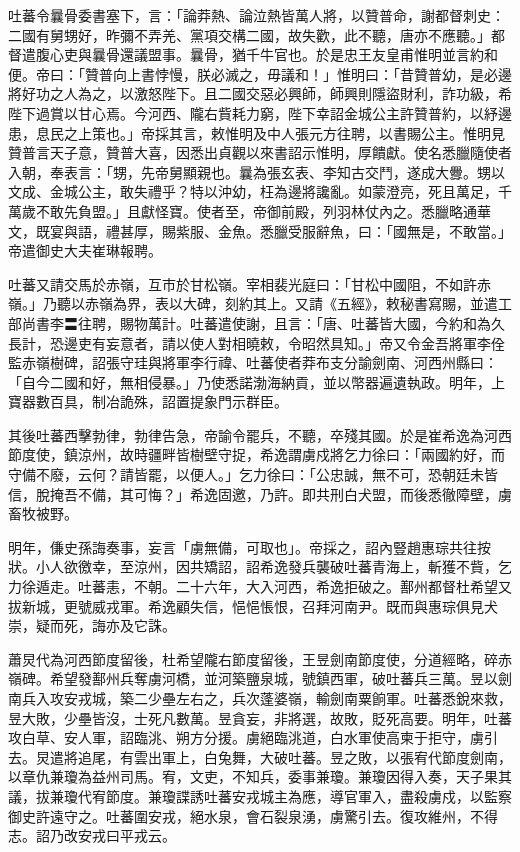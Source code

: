 \begin{pinyinscope}
 吐蕃令曩骨委書塞下，言：「論莽熱、論泣熱皆萬人將，以贊普命，謝都督刺史：二國有舅甥好，昨彌不弄羌、黨項交構二國，故失歡，此不聽，唐亦不應聽。」都督遣腹心吏與曩骨還議盟事。曩骨，猶千牛官也。於是忠王友皇甫惟明並言約和便。帝曰：「贊普向上書悖慢，朕必滅之，毋議和！」惟明曰：「昔贊普幼，是必邊將好功之人為之，以激怒陛下。且二國交惡必興師，師興則隱盜財利，詐功級，希陛下過賞以甘心焉。今河西、隴右貲耗力窮，陛下幸詔金城公主許贊普約，以紓邊患，息民之上策也。」帝採其言，敕惟明及中人張元方往聘，以書賜公主。惟明見贊普言天子意，贊普大喜，因悉出貞觀以來書詔示惟明，厚饋獻。使名悉臘隨使者入朝，奉表言：「甥，先帝舅顯親也。曩為張玄表、李知古交鬥，遂成大釁。甥以文成、金城公主，敢失禮乎？特以沖幼，枉為邊將讒亂。如蒙澄亮，死且萬足，千萬歲不敢先負盟。」且獻怪寶。使者至，帝御前殿，列羽林仗內之。悉臘略通華文，既宴與語，禮甚厚，賜紫服、金魚。悉臘受服辭魚，曰：「國無是，不敢當。」帝遣御史大夫崔琳報聘。



 吐蕃又請交馬於赤嶺，互市於甘松嶺。宰相裴光庭曰：「甘松中國阻，不如許赤嶺。」乃聽以赤嶺為界，表以大碑，刻約其上。又請《五經》，敕秘書寫賜，並遣工部尚書李〓往聘，賜物萬計。吐蕃遣使謝，且言：「唐、吐蕃皆大國，今約和為久長計，恐邊吏有妄意者，請以使人對相曉敕，令昭然具知。」帝又令金吾將軍李佺監赤嶺樹碑，詔張守珪與將軍李行禕、吐蕃使者莽布支分諭劍南、河西州縣曰：「自今二國和好，無相侵暴。」乃使悉諾渤海納貢，並以幣器遍遺執政。明年，上寶器數百具，制冶詭殊，詔置提象門示群臣。



 其後吐蕃西擊勃律，勃律告急，帝諭令罷兵，不聽，卒殘其國。於是崔希逸為河西節度使，鎮涼州，故時疆畔皆樹壁守捉，希逸謂虜戍將乞力徐曰：「兩國約好，而守備不廢，云何？請皆罷，以便人。」乞力徐曰：「公忠誠，無不可，恐朝廷未皆信，脫掩吾不備，其可悔？」希逸固邀，乃許。即共刑白犬盟，而後悉徹障壁，虜畜牧被野。



 明年，傔史孫誨奏事，妄言「虜無備，可取也」。帝採之，詔內豎趙惠琮共往按狀。小人欲徼幸，至涼州，因共矯詔，詔希逸發兵襲破吐蕃青海上，斬獲不貲，乞力徐遁走。吐蕃恚，不朝。二十六年，大入河西，希逸拒破之。鄯州都督杜希望又拔新城，更號威戎軍。希逸顧失信，悒悒悵恨，召拜河南尹。既而與惠琮俱見犬崇，疑而死，誨亦及它誅。



 蕭炅代為河西節度留後，杜希望隴右節度留後，王昱劍南節度使，分道經略，碎赤嶺碑。希望發鄯州兵奪虜河橋，並河築鹽泉城，號鎮西軍，破吐蕃兵三萬。昱以劍南兵入攻安戎城，築二少壘左右之，兵次蓬婆嶺，輸劍南粟餉軍。吐蕃悉銳來救，昱大敗，少壘皆沒，士死凡數萬。昱貪妄，非將選，故敗，貶死高要。明年，吐蕃攻白草、安人軍，詔臨洮、朔方分援。虜絕臨洮道，白水軍使高柬于拒守，虜引去。炅遣將追尾，有雲出軍上，白兔舞，大破吐蕃。昱之敗，以張宥代節度劍南，以章仇兼瓊為益州司馬。宥，文吏，不知兵，委事兼瓊。兼瓊因得入奏，天子果其議，拔兼瓊代宥節度。兼瓊諜誘吐蕃安戎城主為應，導官軍入，盡殺虜戍，以監察御史許遠守之。吐蕃圍安戎，絕水泉，會石裂泉湧，虜驚引去。復攻維州，不得志。詔乃改安戎曰平戎云。




\end{pinyinscope}
